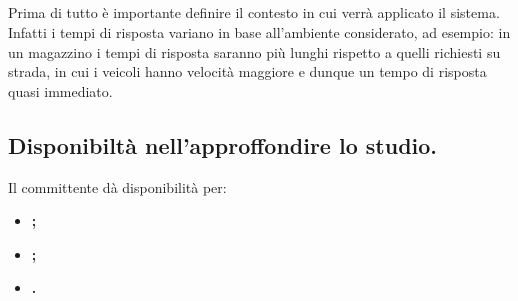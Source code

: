 \documentclass[]{article}
\begin{document}
		\subsection{}
		Prima di tutto è importante definire il contesto in cui verrà applicato il sistema.\\
		Infatti i tempi di risposta variano in base all'ambiente considerato, ad esempio: in un magazzino i tempi di risposta saranno più lunghi
		rispetto a quelli richiesti su strada, in cui i veicoli hanno velocità maggiore e dunque un tempo di risposta quasi immediato.

		\subsection{Disponibiltà nell'approffondire lo studio.}
		Il committente dà disponibilità per:
		\begin{itemize}
			\item \bfseries{};
			\item \bfseries{};
			\item \bfseries{}.
		\end{itemize}
\end{document}
